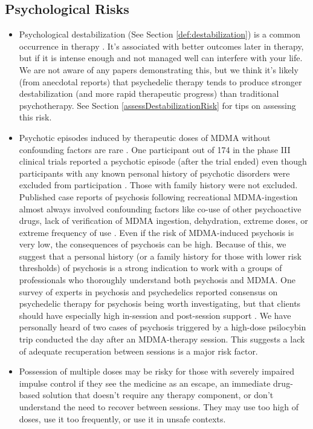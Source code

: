 \documentclass[12pt,letterpaper]{book}
\begin{document}
\subsection*{Psychological Risks}
\begin{itemize}
    \item Psychological destabilization (See Section \ref{def:destabilization}) is a common occurrence in therapy \cite{olthofDestabilization}. It's associated with better outcomes later in therapy, but if it is intense enough and not managed well can interfere with your life. We are not aware of any papers demonstrating this, but we think it's likely (from anecdotal reports) that psychedelic therapy tends to produce stronger destabilization (and more rapid therapeutic progress) than traditional psychotherapy. See Section \ref{assessDestabilizationRisk} for tips on assessing this risk.
    \item Psychotic episodes induced by therapeutic doses of MDMA without confounding factors are rare \cite{arnovitzSchizophrenia}. One participant out of 174 in the phase III clinical trials reported a psychotic episode (after the trial ended) even though participants with any known personal history of psychotic disorders were excluded from participation \cite{powerTrip,smithSystematic,mitchellMDMAClinicalTrial2}. Those with family history were not excluded. Published case reports of psychosis following recreational MDMA-ingestion almost always involved confounding factors like co-use of other psychoactive drugs, lack of verification of MDMA ingestion, dehydration, extreme doses, or extreme frequency of use \cite{mcguirePsychosis,patelPsychosis,vaivaPsychosis}. Even if the risk of MDMA-induced psychosis is very low, the consequences of psychosis can be high. Because of this, we suggest that a personal history (or a family history for those with lower risk thresholds) of psychosis is a strong indication to work with a groups of professionals who thoroughly understand both psychosis and MDMA. One survey of experts in psychosis and psychedelics reported consensus on psychedelic therapy for psychosis being worth investigating, but that clients should have especially high in-session and post-session support \cite{la2022Psychosis}. We have personally heard of two cases of psychosis triggered by a high-dose psilocybin trip conducted the day after an MDMA-therapy session. This suggests a lack of adequate recuperation between sessions is a major risk factor.
    \item Possession of multiple doses may be risky for those with severely impaired impulse control if they see the medicine as an escape, an immediate drug-based solution that doesn't require any therapy component, or don't understand the need to recover between sessions. They may use too high of doses, use it too frequently, or use it in unsafe contexts.

\end{itemize}
\end{document}

